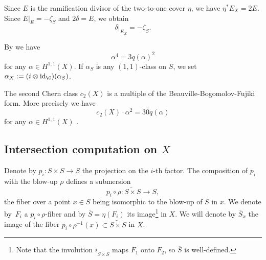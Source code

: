 \documentclass[JEP,XML,SOM,Unicode,NoEqCountersInSection,published]{cedram}
\theoremstyle{plain}
\theoremstyle{definition}
\newcommand{\holom}[3]{\ensuremath{#1:#2\to #3}}
\newcommand{\fibre}[2]{\ensuremath{#1^{-1} (#2)}}
\newcommand{\barS}{\ensuremath{\overline{S}}}
\newcommand{\blS}{\ensuremath{\widetilde{S \times S}}}
\DeclareMathOperator{\id}{id}
\begin{document}
Since $E$ is the ramification divisor of the two-to-one cover $\eta$, we have $\eta^* E_X = 2 E$.
Since $E|_E = -\zeta_S$ and $2 \delta = E$, we obtain
\begin{equation} \label{restrictdelta}
\delta|_{E_X} = - \zeta_S.
\end{equation}

By \cite[\S 9, Lem.\,1]{Bea83} we have
\begin{equation} \label{qsurface}
\alpha^4 = 3 q(\alpha)^2
\end{equation}
for any $\alpha\in H^{1,1} (X)$. If $\alpha_S$ is any $(1,1)$-class on $S$, we set $\alpha_X:= (i \otimes \id_\C)(\alpha_S)$.

The second Chern class $c_2(X)$ is a multiple of the Beauville-Bogomolov-Fujiki form. More precisely we have
\begin{equation} \label{qctwo}
c_2(X) \cdot \alpha^2 = 30 q(\alpha)
\end{equation}
for any $\alpha\in H^{1,1} (X)$ \cite[\S 3.1]{Ott15}.

\subsection{Intersection computation on $X$}

Denote by $\holom{p_i}{S \times S}{S}$ the projection on the $i$-th factor.
The composition of $p_i$ with the blow-up $\rho$ defines a submersion
\[
p_i \circ \rho: \blS \to S,
\]
the fiber over a point $x \in S$ being isomorphic to the blow-up of $S$ in $x$.
We denote by~$F_i$ a $p_i \circ \rho$-fiber and by $\bar S = \eta(F_i)$ its image\footnote{Note that the involution $i_{\blS}$ maps $F_1$ onto $F_2$, so $\barS$ is well-defined.} in $X$.
We will denote by $\bar S_x$ the image of the fiber $\fibre{p_i \circ \rho}{x} \subset \blS$ in $X$.
\end{document}
